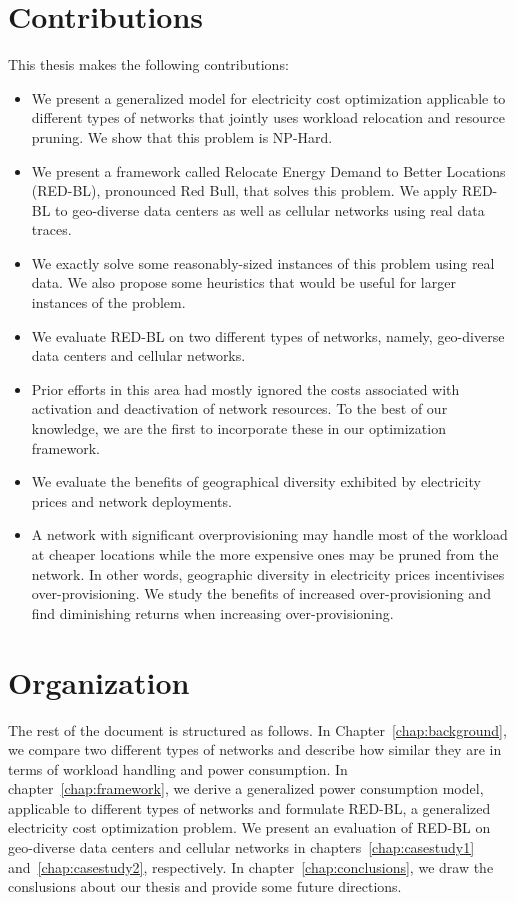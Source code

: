 \section{Contributions} This thesis makes the following contributions:

\begin{itemize}
\item We present a generalized model for electricity cost optimization applicable to different types of networks that jointly uses workload relocation and resource pruning. We show that this problem is NP-Hard.
\item We present a framework called Relocate Energy Demand to Better Locations (RED-BL), pronounced Red Bull, that solves this problem. We apply RED-BL to geo-diverse data centers as well as cellular networks using real data traces.
\item We exactly solve some reasonably-sized instances of this problem using real data. We also propose some heuristics that would be useful for larger instances of the problem. 
\item We evaluate RED-BL on two different types of networks, namely, geo-diverse data centers and cellular networks.
\item Prior efforts in this area had mostly ignored the costs associated with activation and deactivation of network resources. To the best of our knowledge, we are the first to incorporate these in our optimization framework.
\item We evaluate the benefits of geographical diversity exhibited by electricity prices and network deployments.
\item A network with significant overprovisioning may handle most of the workload at cheaper locations while the more expensive ones may be pruned from the network. In other words, geographic diversity in electricity prices incentivises over-provisioning. We study the benefits of increased over-provisioning and find diminishing returns when increasing over-provisioning.
\end{itemize}

\section{Organization} The rest of the document is structured as follows. In Chapter~\ref{chap:background}, we compare two different types of networks and describe how similar they are in terms of workload handling and power consumption. In chapter~\ref{chap:framework}, we derive a generalized power consumption model, applicable to different types of networks and formulate RED-BL, a generalized electricity cost optimization problem. We present an evaluation of RED-BL on geo-diverse data centers and cellular networks in chapters~\ref{chap:casestudy1} and~\ref{chap:casestudy2}, respectively. In chapter~\ref{chap:conclusions}, we draw the conslusions about our thesis and provide some future directions.